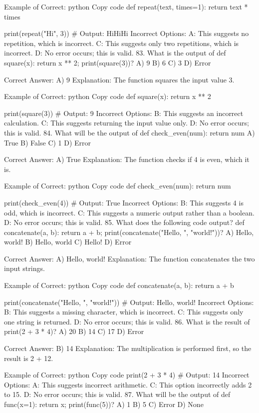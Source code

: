 Example of Correct:
python
Copy code
def repeat(text, times=1):
    return text * times

print(repeat("Hi", 3))  # Output: HiHiHi
Incorrect Options:
A: This suggests no repetition, which is incorrect.
C: This suggests only two repetitions, which is incorrect.
D: No error occurs; this is valid.
83. What is the output of def square(x): return x ** 2; print(square(3))?
A) 9
B) 6
C) 3
D) Error

Correct Answer: A) 9
Explanation: The function squares the input value 3.

Example of Correct:
python
Copy code
def square(x):
    return x ** 2

print(square(3))  # Output: 9
Incorrect Options:
B: This suggests an incorrect calculation.
C: This suggests returning the input value only.
D: No error occurs; this is valid.
84. What will be the output of def check_even(num): return num %
A) True
B) False
C) 1
D) Error

Correct Answer: A) True
Explanation: The function checks if 4 is even, which it is.

Example of Correct:
python
Copy code
def check_even(num):
    return num %

print(check_even(4))  # Output: True
Incorrect Options:
B: This suggests 4 is odd, which is incorrect.
C: This suggests a numeric output rather than a boolean.
D: No error occurs; this is valid.
85. What does the following code output? def concatenate(a, b): return a + b; print(concatenate("Hello, ", "world!"))?
A) Hello, world!
B) Hello, world
C) Hello!
D) Error

Correct Answer: A) Hello, world!
Explanation: The function concatenates the two input strings.

Example of Correct:
python
Copy code
def concatenate(a, b):
    return a + b

print(concatenate("Hello, ", "world!"))  # Output: Hello, world!
Incorrect Options:
B: This suggests a missing character, which is incorrect.
C: This suggests only one string is returned.
D: No error occurs; this is valid.
86. What is the result of print(2 + 3 * 4)?
A) 20
B) 14
C) 17
D) Error

Correct Answer: B) 14
Explanation: The multiplication is performed first, so the result is 2 + 12.

Example of Correct:
python
Copy code
print(2 + 3 * 4)  # Output: 14
Incorrect Options:
A: This suggests incorrect arithmetic.
C: This option incorrectly adds 2 to 15.
D: No error occurs; this is valid.
87. What will be the output of def func(x=1): return x; print(func(5))?
A) 1
B) 5
C) Error
D) None

